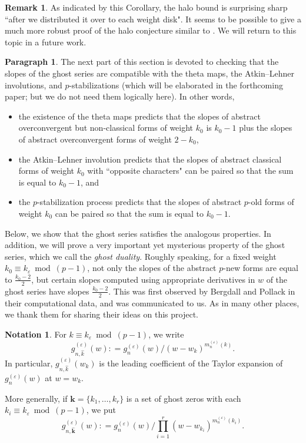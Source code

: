 \documentclass[12pt]{amsart}
\theoremstyle{definition}
\newtheorem{remark}[subsection]{Remark}
\newtheorem{notation}[subsection]{Notation}
\newtheorem{para}[subsection]{Paragraph}
\numberwithin{equation}{subsection}
\def\bfk{\mathbf{k}}
\begin{document}
\begin{remark}
\label{R:modified halo bound sharp}
As indicated by this Corollary, the halo bound is surprising sharp ``after we distributed it over to each weight disk". It seems to be possible to give a much more robust proof of the halo conjecture similar to \cite{liu-wan-xiao}. We will return to this topic in a future work.
\end{remark}



\begin{para}
\label{P:para_132}
The next part of this section is devoted to checking that the slopes of the ghost series are compatible with the theta maps, the Atkin--Lehner involutions, and $p$-stabilizations (which will be elaborated in the forthcoming paper; but we do not need them logically here). In other words, 
\begin{itemize}
\item 
the existence of the theta maps predicts that the slopes of abstract overconvergent but non-classical forms of weight $k_0$ is $k_0-1$ plus the slopes of abstract overconvergent forms of weight $2-k_0$,
\item 
the Atkin--Lehner involution predicts that the slopes of abstract classical forms of weight $k_0$ with ``opposite characters" can be paired so that the sum is equal to $k_0-1$, and
\item
the $p$-stabilization process predicts that the slopes of abstract $p$-old forms of weight $k_0$ can be paired so that the sum is equal to $k_0-1$.
\end{itemize}
Below, we show that the ghost series satisfies the analogous properties.
In addition, we will prove a very important yet mysterious property of the ghost series, which we call the \emph{ghost duality}. Roughly speaking, for a fixed weight $k_0 \equiv k_\varepsilon \bmod{(p-1)}$, not only the slopes of the abstract $p$-new forms  are equal to $\frac{k_0-2}2$, but certain slopes computed using appropriate derivatives in $w$ of the ghost series have slopes $\frac{k_0-2}2$. This was first observed by Bergdall and Pollack in their computational data, and was communicated to us. As in many other places, we thank them for sharing their ideas on this project.
\end{para}

\begin{notation}
\label{N:gnhatk}
For $k \equiv k_\varepsilon \bmod {(p-1)}$, we write 
$$
g^{(\varepsilon)}_{n,\hat k}(w): = g_n^{(\varepsilon)}(w) \big/ (w-w_k)^{m_n^{(\varepsilon)}(k)}.
$$
In particular, $g^{(\varepsilon)}_{n,\hat k}(w_k)$ is the leading coefficient of the Taylor expansion of $g_n^{(\varepsilon)}(w)$ at $w=w_k$.

More generally, if $\bfk = \{k_1, \dots, k_r\}$ is a set of ghost zeros with each $k_i \equiv k_\varepsilon \bmod (p-1)$, we put
$$
g^{(\varepsilon)}_{n,\hat {\bfk}}(w): = g_n^{(\varepsilon)}(w) \big/ \prod_{i=1}^r(w-w_{k_i})^{m_n^{(\varepsilon)}(k_i)}.
$$
\end{notation}
\end{document}
